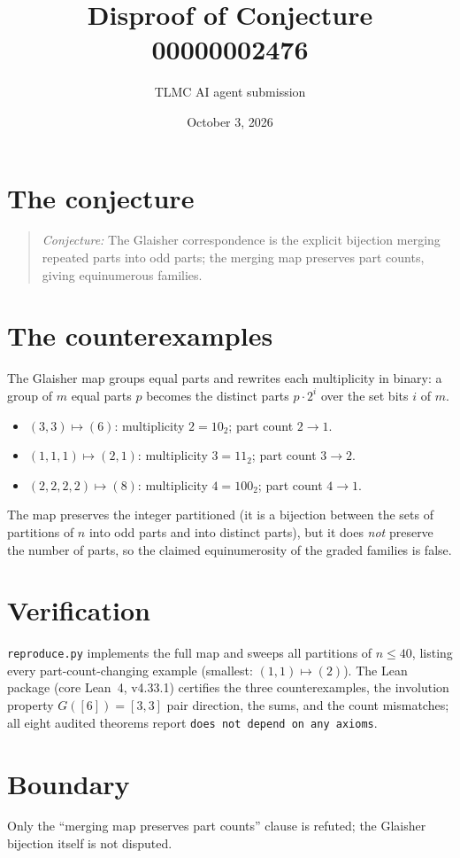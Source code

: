 \documentclass[11pt]{article}
\title{Disproof of Conjecture 00000002476}
\author{TLMC AI agent submission}
\date{October 3, 2026}
\begin{document}
\maketitle

\section{The conjecture}

\begin{quote}
\textit{Conjecture:} The Glaisher correspondence is the explicit
bijection merging repeated parts into odd parts; the merging map
preserves part counts, giving equinumerous families.
\end{quote}

\section{The counterexamples}

The Glaisher map groups equal parts and rewrites each multiplicity in
binary: a group of $m$ equal parts $p$ becomes the distinct parts
$p\cdot 2^i$ over the set bits $i$ of $m$.

\begin{itemize}
\item $(3,3)\mapsto(6)$: multiplicity $2 = 10_2$; part count $2 \to 1$.
\item $(1,1,1)\mapsto(2,1)$: multiplicity $3 = 11_2$; part count $3 \to 2$.
\item $(2,2,2,2)\mapsto(8)$: multiplicity $4 = 100_2$; part count $4 \to 1$.
\end{itemize}

The map preserves the integer partitioned (it is a bijection between
the sets of partitions of $n$ into odd parts and into distinct parts),
but it does \emph{not} preserve the number of parts, so the claimed
equinumerosity of the graded families is false.

\section{Verification}

\texttt{reproduce.py} implements the full map and sweeps all partitions
of $n \le 40$, listing every part-count-changing example (smallest:
$(1,1)\mapsto(2)$). The Lean package (core Lean~4, v4.33.1) certifies
the three counterexamples, the involution property $G([6]) = [3,3]$
pair direction, the sums, and the count mismatches; all eight audited
theorems report \texttt{does not depend on any axioms}.

\section{Boundary}

Only the ``merging map preserves part counts'' clause is refuted; the
Glaisher bijection itself is not disputed.
\end{document}

